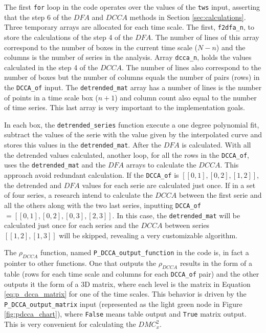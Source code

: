 \documentclass[article]{jss}
\begin{document}
The first \verb"for" loop in the code operates over the values of the \verb"tws" input, asserting that the step 6 of the $DFA$ and $DCCA$ methods in Section \ref{sec:calculations}. Three temporary arrays are allocated for each time scale. The first, \verb"f2dfa_n", to store the calculations of the step 4 of the $DFA$. The number of lines of this array correspond to the number of boxes in the current time scale ($N - n$) and the columns is the number of series in the analysis. Array  \verb"dcca_n", holds the values calculated in the step 4 of the $DCCA$. The number of lines also correspond to the number of boxes but the number of columns equals the number of pairs (rows) in the \verb"DCCA_of" input. The \verb"detrended_mat" array has a number of lines is the number of points in a time scale box ($n +1$) and column count also equal to the number of time series. This last array is very important to the implementation goals.

In each box, the \verb"detrended_series" function execute a one degree polynomial fit, subtract the values of the serie with the value given by the interpolated curve and stores this values in the \verb"detrended_mat". After the $DFA$ is calculated. With all the detrended values calculated, another loop, for all the rows in the \verb"DCCA_of", uses the \verb"detrended_mat" and the $DFA$ arrays to calculate the $DCCA$. This approach avoid redundant calculation. If the \verb"DCCA_of" is $[[0,1], [0,2], [1,2]]$, the detrended and $DFA$ values for each serie are calculated just once. If in a set of four series, a research intend to calculate the $DCCA$ between the first serie and all the others along with the two last series, inputting  \verb"DCCA_of" $= [[0,1], [0,2], [0,3], [2,3]]$. In this case, the \verb"detrended_mat" will be calculated just once for each series and the $DCCA$ between series $[[1,2], [1,3]]$ will be skipped, revealing a very customizable algorithm. 

The $\rho_{DCCA}$ function, named \verb"P_DCCA_output_function" in the code is, in fact a pointer to other functions. One that outputs the  $\rho_{DCCA}$ results in the form of a table (rows for each time scale and columns for each \verb"DCCA_of" pair) and the other outputs it the form of a 3D matrix, where each level is the matrix in Equation \ref{eq:p_dcca_matrix} for one of the time scales. This behavior is driven by the \verb"P_DCCA_output_matrix" input (represented as the light green node in Figure \ref{fig:pdcca_chart}), where \verb"False" means table output and \verb"True" matrix output. This is very convenient for calculating the $DMC_x^2$.
\end{document}
